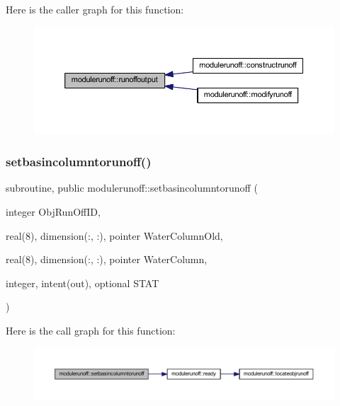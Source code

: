 Here is the caller graph for this function\+:\nopagebreak
\begin{figure}[H]
\begin{center}
\leavevmode
\includegraphics[width=350pt]{namespacemodulerunoff_af0c6bd2433c33b62204214405fa2bd23_icgraph}
\end{center}
\end{figure}
\mbox{\label{namespacemodulerunoff_a1bdc99360bd152034690c7eed836b2cf}} 
\subsubsection{\texorpdfstring{setbasincolumntorunoff()}{setbasincolumntorunoff()}}
{\footnotesize\ttfamily subroutine, public modulerunoff\+::setbasincolumntorunoff (\begin{DoxyParamCaption}\item[{integer}]{Obj\+Run\+Off\+ID,  }\item[{real(8), dimension(\+:, \+:), pointer}]{Water\+Column\+Old,  }\item[{real(8), dimension(\+:, \+:), pointer}]{Water\+Column,  }\item[{integer, intent(out), optional}]{S\+T\+AT }\end{DoxyParamCaption})}

Here is the call graph for this function\+:\nopagebreak
\begin{figure}[H]
\begin{center}
\leavevmode
\includegraphics[width=350pt]{namespacemodulerunoff_a1bdc99360bd152034690c7eed836b2cf_cgraph}
\end{center}
\end{figure}
\mbox{\label{namespacemodulerunoff_a94b297f6c1f0a65686f92178ebe5d5c2}} 
